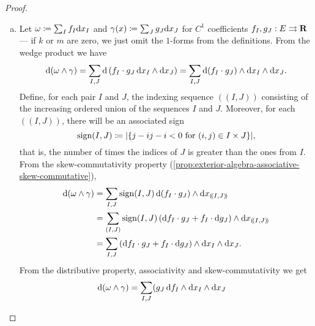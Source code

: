 \begin{proof}
    \begin{enumerate}[(a)]\setlength\itemsep{0em}
        \item Let \(\omega \coloneq \sum_I f_{I} \mathrm{d} x_I\) and \(\gamma(x)
              \coloneq \sum_J g_{J} \mathrm{d} x_{J}\) for \(C^1\) coefficients \(f_I, g_J: E
              \rightrightarrows \mathbf{R}\) --- if \(k\) or \(m\) are zero, we just omit the
              \(1\)-forms from the definitions. From the wedge product we have
              \[
                  \mathrm{d}(\omega \wedge \gamma)
                  = \sum_{I, J} \mathrm{d}\left( f_I \cdot g_J\, \mathrm{d} x_I \wedge \mathrm{d} x_J \right)
                  = \sum_{I, J} \mathrm{d}(f_I \cdot g_J) \wedge \mathrm{d} x_I \wedge \mathrm{d} x_J.
              \]
              Define, for each pair \(I\) and \(J\), the indexing sequence \((\!(I, J)\!)\)
              consisting of the increasing ordered union of the sequences \(I\) and
              \(J\). Moreover, for each \((\!(I, J)\!)\), there will be an associated sign
              \begin{equation}
                  \label{eq:sequence-index-sign}
                  \operatorname{sign}(I, J) \coloneq |\{j - i \relax j - i < 0 \text{ for }
                  (i, j) \in I \times J\}|,
              \end{equation}
              that is, the number of times the indices of \(J\) is greater than the ones
              from \(I\). From the skew-commutativity property
              (\cref{prop:exterior-algebra-associative-skew-commutative}),
              \begin{align*}
                  \mathrm{d} (\omega \wedge \gamma)
                   & = \sum_{I, J} \operatorname{sign}(I, J)\,
                  \mathrm{d}(f_{I} \cdot g_{J}) \wedge \mathrm{d} x_{(\!(I, J)\!)}                    \\
                   & = \sum_{(I, J)} \operatorname{sign}(I, J)
                  \left( \mathrm{d} f_I \cdot g_J + f_I \cdot \mathrm{d} g_J \right)
                  \wedge \mathrm{d} x_{(\!(I, J)\!)}                                             \\
                   & = \sum_{I, J} \left( \mathrm{d} f_I \cdot g_J + f_I \cdot \mathrm{d} g_J \right)
                  \wedge \mathrm{d} x_I \wedge \mathrm{d} x_J.
              \end{align*}
              From the distributive property, associativity and skew-commutativity we get
              \begin{align*}
                  \diff(\omega \wedge \gamma)
                   & = \sum_{I, J} (g_J\, \diff f_I \wedge \diff x_I \wedge \diff x_J

\end{align*}
\end{enumerate}
\end{proof}
